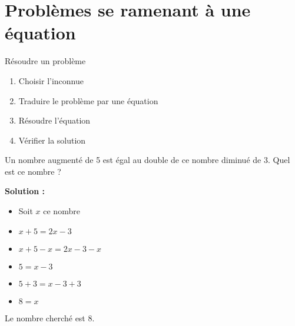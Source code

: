 \section{Problèmes se ramenant à une équation}
\begin{methode}{Résoudre un problème}
\begin{enumerate}
    \item Choisir l'inconnue
    \item Traduire le problème par une équation
    \item Résoudre l'équation
    \item Vérifier la solution
\end{enumerate}
\end{methode}

\begin{exemple}
Un nombre augmenté de 5 est égal au double de ce nombre diminué de 3. Quel est ce nombre ?

\textbf{Solution :}
\begin{itemize}
    \item Soit $x$ ce nombre
    \item $x + 5 = 2x - 3$
    \item $x + 5 - x = 2x - 3 - x$
    \item $5 = x - 3$
    \item $5 + 3 = x - 3 + 3$
    \item $8 = x$
\end{itemize}
Le nombre cherché est 8.
\end{exemple} 